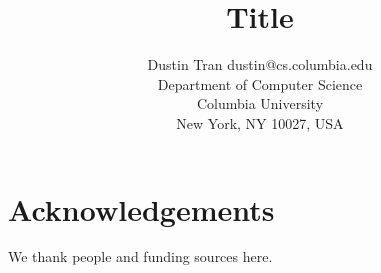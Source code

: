 \documentclass[twoside,11pt]{article}
\begin{document}
\title{Title}
\author{\name Dustin Tran \email dustin@cs.columbia.edu\\
\addr Department of Computer Science\\
Columbia University\\
New York, NY 10027, USA
}


\maketitle
\begin{abstract}%
\end{abstract}


\section*{Acknowledgements}
\PP We thank people and funding sources here.

\clearpage


\end{document}
